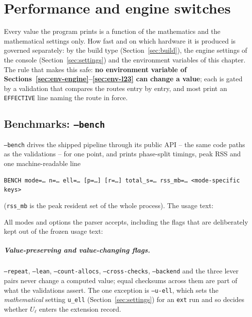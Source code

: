 \documentclass[11pt,openany]{report}
\newcommand{\cli}[1]{\texttt{#1}}
\newcommand{\vb}[1]{\texttt{#1}}
\begin{document}
\chapter{Performance and engine switches}\label{ch:perf}

Every value the program prints is a function of the mathematics and the mathematical settings only. How fast and on which
hardware it is produced is governed separately: by the build type (Section~\ref{sec:build}), the engine settings of the
console (Section~\ref{sec:settings}) and the environment variables of this chapter. The rule that makes this safe:
\textbf{no environment variable of Sections~\ref{sec:env-engine}--\ref{sec:env-l23} can change a value}; each is gated by a
validation that compares the routes entry by entry, and most print an \texttt{EFFECTIVE} line naming the route in force.

\section{Benchmarks: \texttt{--bench}}\label{sec:bench}

\cli{--bench} drives the shipped pipeline through its public API -- the same code paths as the
validations -- for one point, and prints phase-split timings, peak RSS and one machine-readable line
\begin{center}
\texttt{BENCH mode=\dots{} n=\dots{} ell=\dots{} [p=\dots] [r=\dots] total\_s=\dots{} rss\_mb=\dots{} <mode-specific keys>}
\end{center}
(\texttt{rss\_mb} is the peak resident set of the whole process). The usage text:



All modes and options the parser accepts, including the flags that are deliberately kept out of the
frozen usage text:



\paragraph{Value-preserving and value-changing flags.} \cli{--repeat}, \cli{--lean},
\cli{--count-allocs}, \cli{--cross-checks}, \cli{--backend} and the three lever pairs never change a
computed value; equal checksums across them are part of what the validations assert. The one exception
is \cli{--u-ell}, which sets the \emph{mathematical} setting \vb{u\_ell} (Section~\ref{sec:settings})
for an \texttt{ext} run and so decides whether $U_\ell$ enters the extension record.
\end{document}
